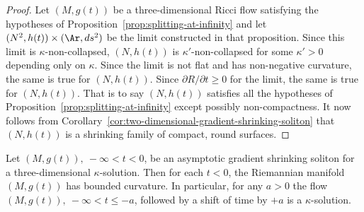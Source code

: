 \begin{proof}
Let $(M,g(t))$ be a three-dimensional Ricci flow satisfying the
hypotheses of Proposition~\ref{prop:splitting-at-infinity} and let $(N^2,h(t))\times
(\Ar,ds^2)$ be the limit constructed in that proposition. Since this
limit is $\kappa$-non-collapsed, $(N,h(t))$ is
$\kappa'$-non-collapsed for some $\kappa'>0$ depending only on
$\kappa$. Since the limit is not flat and has non-negative
curvature, the same is true for $(N,h(t))$. Since $\partial
R/\partial t\ge 0$ for the limit, the same is true for $(N,h(t))$.
That is to say $(N,h(t))$ satisfies all the hypotheses of
Proposition~\ref{prop:splitting-at-infinity} except possibly non-compactness. It now
follows from Corollary~\ref{cor:two-dimensional-gradient-shrinking-soliton} that $(N,h(t))$ is a shrinking
family of compact, round surfaces.
\end{proof}


\begin{corollary}\label{cor:three-dimensional-asymptotic-soliton-bounded-curvature}
\label{3DGSSkappa}
Let $(M,g(t)),\ -\infty<t<0$, be an asymptotic gradient shrinking soliton for a
three-dimensional $\kappa$-solution. Then for each $t<0$, the Riemannian
manifold $(M,g(t))$ has bounded curvature. In particular, for any $a>0$ the
flow $(M,g(t)),\ -\infty<t\le -a$, followed by a shift of time by $+a$ is a
$\kappa$-solution.
\end{corollary}

